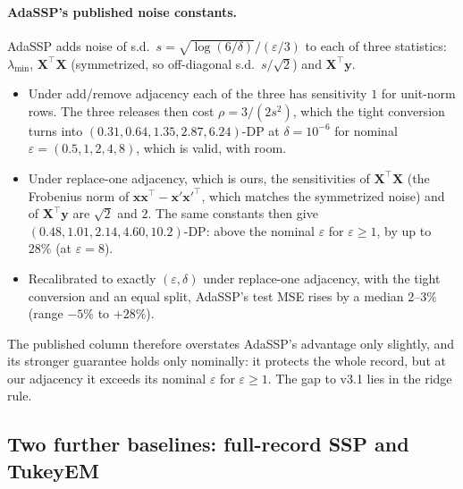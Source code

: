 \documentclass[11pt]{article}
\newif\ifshowchecks
\newcounter{checkitem}
\newcommand{\tocheck}[1]{%
  \ifshowchecks
    \refstepcounter{checkitem}%
    \addcontentsline{loc}{checkitem}{\protect\numberline{\thecheckitem}#1}%
    {\color{red!65!black}\sffamily\small[\textbf{Check~\thecheckitem:} #1]}%
  \fi}
\theoremstyle{definition}
\theoremstyle{plain}
\newcommand{\bX}{\mathbf{X}}
\newcommand{\by}{\mathbf{y}}
\newcommand{\bx}{\mathbf{x}}
\begin{document}
\paragraph{AdaSSP's published noise constants.} AdaSSP adds noise of s.d.\ $s = \sqrt{\log(6/\delta)}/(\varepsilon/3)$ to each of three statistics: $\lambda_{\min}$, $\bX^\top\bX$ (symmetrized, so off-diagonal s.d.\ $s/\sqrt2$) and $\bX^\top\by$.
\begin{itemize}[noitemsep]
  \item Under add/remove adjacency each of the three has sensitivity $1$ for unit-norm rows. The three releases then cost $\rho = 3/(2s^2)$, which the tight conversion turns into $(0.31, 0.64, 1.35, 2.87, 6.24)$-DP at $\delta = 10^{-6}$ for nominal $\varepsilon = (0.5, 1, 2, 4, 8)$, which is valid, with room.
  \item Under replace-one adjacency, which is ours, the sensitivities of $\bX^\top\bX$ (the Frobenius norm of $\bx\bx^\top - \bx'\bx'^\top$, which matches the symmetrized noise) and of $\bX^\top\by$ are $\sqrt2$ and $2$. The same constants then give $(0.48, 1.01, 2.14, 4.60, 10.2)$-DP: above the nominal $\varepsilon$ for $\varepsilon \ge 1$, by up to $28\%$ (at $\varepsilon = 8$).
  \item Recalibrated to exactly $(\varepsilon, \delta)$ under replace-one adjacency, with the tight conversion and an equal split, AdaSSP's test MSE rises by a median $2$--$3\%$ (range $-5\%$ to $+28\%$).
\end{itemize}
The published column therefore overstates AdaSSP's advantage only slightly, and its stronger guarantee holds only nominally: it protects the whole record, but at our adjacency it exceeds its nominal $\varepsilon$ for $\varepsilon \ge 1$. The gap to v3.1 lies in the ridge rule.

\tocheck{AdaSSP's adjacency: the published constants are consistent with add/remove adjacency (sensitivity 1 for each statistic); confirm against the statement in Wang (2018) before citing it.}

\subsection{Two further baselines: full-record SSP and TukeyEM}
\label{sec:eval:baselines}
\end{document}
